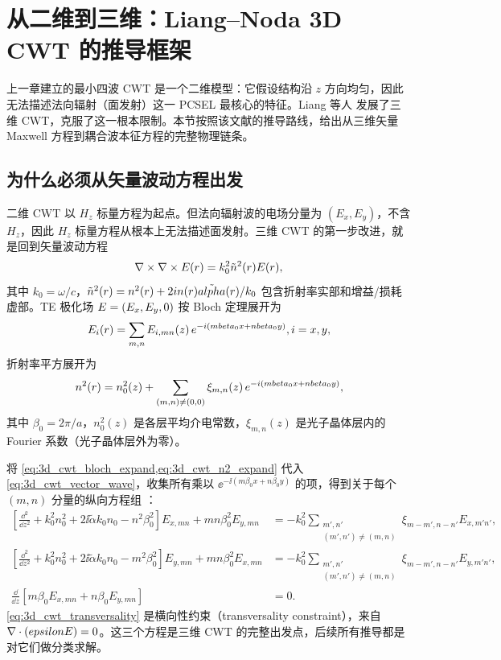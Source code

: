 \section{从二维到三维：Liang--Noda 3D CWT 的推导框架}
\label{sec:3d-cwt-derivation}

上一章建立的最小四波 CWT 是一个二维模型：它假设结构沿 $z$ 方向均匀，因此无法描述法向辐射（面发射）这一 PCSEL 最核心的特征。Liang 等人 \cite{liang2012square} 发展了三维 CWT，克服了这一根本限制。本节按照该文献的推导路线，给出从三维矢量 Maxwell 方程到耦合波本征方程的完整物理链条。

\subsection{为什么必须从矢量波动方程出发}

二维 CWT 以 $H_z$ 标量方程为起点。但法向辐射波的电场分量为 $(E_x,E_y)$，不含 $H_z$，因此 $H_z$ 标量方程从根本上无法描述面发射。三维 CWT 的第一步改进，就是回到矢量波动方程
\begin{equation}
\nabla\times\nabla\times E(r) = k_0^2\tilde{n}^2(r)E(r),
\label{eq:3d_cwt_vector_wave}
\end{equation}
其中 $k_0=\omega/c$，$\tilde{n}^2(r)=n^2(r)+2i n(r)\tilde{alpha}(r)/k_0$ 包含折射率实部和增益/损耗虚部。TE 极化场 $E=(E_x,E_y,0)$ 按 Bloch 定理展开为
\begin{equation}
E_i(r) = \sum_{m,n} E_{i,mn}(z)\,e^{-i(mbeta_0 x + nbeta_0 y)},
 i=x,y,
\label{eq:3d_cwt_bloch_expand}
\end{equation}
折射率平方展开为
\begin{equation}
n^2(r) = n_0^2(z) + \sum_{(m,n)\neq(0,0)} \xi_{m,n}(z)\,e^{-i(mbeta_0 x + nbeta_0 y)},
\label{eq:3d_cwt_n2_expand}
\end{equation}
其中 $\beta_0=2\pi/a$，$n_0^2(z)$ 是各层平均介电常数，$\xi_{m,n}(z)$ 是光子晶体层内的 Fourier 系数（光子晶体层外为零）。

将 \cref{eq:3d_cwt_bloch_expand,eq:3d_cwt_n2_expand} 代入 \cref{eq:3d_cwt_vector_wave}，收集所有乘以 $\ee^{-\ii(m\beta_0 x+n\beta_0 y)}$ 的项，得到关于每个 $(m,n)$ 分量的纵向方程组 \cite{liang2012square}：
\begin{align}
\left[\frac{\dd^2}{\dd z^2}+k_0^2 n_0^2+2\ii\tilde{\alpha}k_0 n_0-n^2\beta_0^2\right]E_{x,mn}+mn\beta_0^2 E_{y,mn}
&= -k_0^2\!\!\sum_{\substack{m',n'\\(m',n')\neq(m,n)}}\xi_{m-m',n-n'}E_{x,m'n'},
\label{eq:3d_cwt_component_x}\\
\left[\frac{\dd^2}{\dd z^2}+k_0^2 n_0^2+2\ii\tilde{\alpha}k_0 n_0-m^2\beta_0^2\right]E_{y,mn}+mn\beta_0^2 E_{x,mn}
&= -k_0^2\!\!\sum_{\substack{m',n'\\(m',n')\neq(m,n)}}\xi_{m-m',n-n'}E_{y,m'n'},
\label{eq:3d_cwt_component_y}\\
\frac{\dd}{\dd z}\left[m\beta_0 E_{x,mn}+n\beta_0 E_{y,mn}\right] &= 0.
\label{eq:3d_cwt_transversality}
\end{align}
\cref{eq:3d_cwt_transversality} 是横向性约束（transversality constraint），来自 $\nabla\cdot(epsilonE)=0$。这三个方程是三维 CWT 的完整出发点，后续所有推导都是对它们做分类求解。

